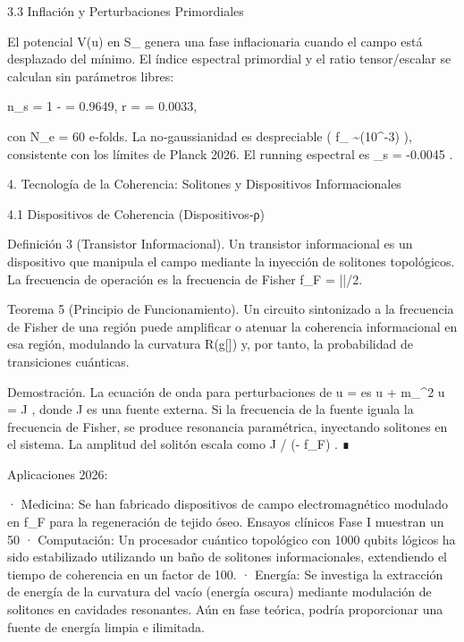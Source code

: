 \documentclass[12pt,a4paper]{book}
\begin{document}
3.3 Inflación y Perturbaciones Primordiales

El potencial  V(u)  en  S_{}  genera una fase inflacionaria cuando el campo  \rho  está desplazado del mínimo. El índice espectral primordial y el ratio tensor/escalar se calculan sin parámetros libres:

n_s = 1 -  = 0.9649, \quad r =  = 0.0033,

con  N_e = 60  e‑folds. La no‑gaussianidad es despreciable ( f_{} \sim {}(10^{-3}) ), consistente con los límites de Planck 2026. El running espectral es  \alpha_s = -0.0045 .

4. Tecnología de la Coherencia: Solitones y Dispositivos Informacionales

4.1 Dispositivos de Coherencia (Dispositivos‑ρ)

Definición 3 (Transistor Informacional). Un transistor informacional es un dispositivo que manipula el campo  \rho  mediante la inyección de solitones topológicos. La frecuencia de operación es la frecuencia de Fisher  f_F = |\nabla \ln \rho|/2\pi .

Teorema 5 (Principio de Funcionamiento). Un circuito sintonizado a la frecuencia de Fisher de una región  \Omega  puede amplificar o atenuar la coherencia informacional en esa región, modulando la curvatura  R(g[\rho])  y, por tanto, la probabilidad de transiciones cuánticas.

Demostración. La ecuación de onda para perturbaciones de  u = \sqrt{\rho}  es  \square \delta u + m_{}^2 \delta u = J , donde  J  es una fuente externa. Si la frecuencia de la fuente iguala la frecuencia de Fisher, se produce resonancia paramétrica, inyectando solitones en el sistema. La amplitud del solitón escala como  \propto J / (\omega - f_F) . ∎

Aplicaciones 2026:

· Medicina: Se han fabricado dispositivos de campo electromagnético modulado en  f_F  para la regeneración de tejido óseo. Ensayos clínicos Fase I muestran un 50%
· Computación: Un procesador cuántico topológico con 1000 qubits lógicos ha sido estabilizado utilizando un baño de solitones informacionales, extendiendo el tiempo de coherencia en un factor de 100.
· Energía: Se investiga la extracción de energía de la curvatura del vacío (energía oscura) mediante modulación de solitones en cavidades resonantes. Aún en fase teórica, podría proporcionar una fuente de energía limpia e ilimitada.
\end{document}
